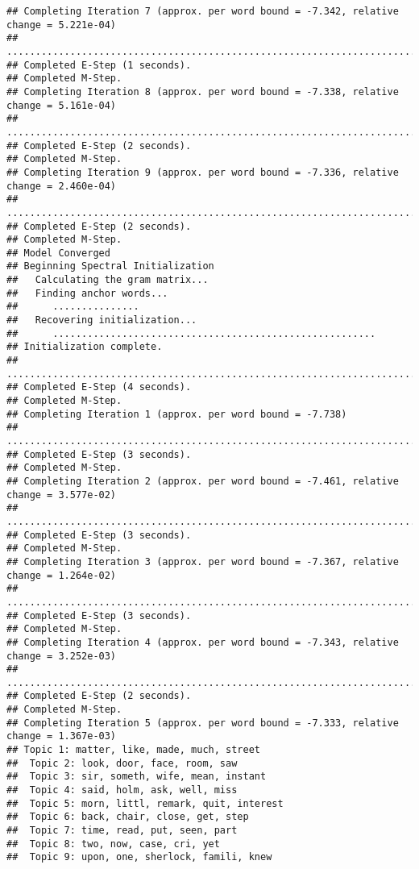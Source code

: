 \documentclass[
]{book}
\begin{document}
\begin{verbatim}
## Completing Iteration 7 (approx. per word bound = -7.342, relative change = 5.221e-04) 
## ....................................................................................................
## Completed E-Step (1 seconds). 
## Completed M-Step. 
## Completing Iteration 8 (approx. per word bound = -7.338, relative change = 5.161e-04) 
## ....................................................................................................
## Completed E-Step (2 seconds). 
## Completed M-Step. 
## Completing Iteration 9 (approx. per word bound = -7.336, relative change = 2.460e-04) 
## ....................................................................................................
## Completed E-Step (2 seconds). 
## Completed M-Step. 
## Model Converged 
## Beginning Spectral Initialization 
##   Calculating the gram matrix...
##   Finding anchor words...
##      ...............
##   Recovering initialization...
##      ........................................................
## Initialization complete.
## ....................................................................................................
## Completed E-Step (4 seconds). 
## Completed M-Step. 
## Completing Iteration 1 (approx. per word bound = -7.738) 
## ....................................................................................................
## Completed E-Step (3 seconds). 
## Completed M-Step. 
## Completing Iteration 2 (approx. per word bound = -7.461, relative change = 3.577e-02) 
## ....................................................................................................
## Completed E-Step (3 seconds). 
## Completed M-Step. 
## Completing Iteration 3 (approx. per word bound = -7.367, relative change = 1.264e-02) 
## ....................................................................................................
## Completed E-Step (3 seconds). 
## Completed M-Step. 
## Completing Iteration 4 (approx. per word bound = -7.343, relative change = 3.252e-03) 
## ....................................................................................................
## Completed E-Step (2 seconds). 
## Completed M-Step. 
## Completing Iteration 5 (approx. per word bound = -7.333, relative change = 1.367e-03) 
## Topic 1: matter, like, made, much, street 
##  Topic 2: look, door, face, room, saw 
##  Topic 3: sir, someth, wife, mean, instant 
##  Topic 4: said, holm, ask, well, miss 
##  Topic 5: morn, littl, remark, quit, interest 
##  Topic 6: back, chair, close, get, step 
##  Topic 7: time, read, put, seen, part 
##  Topic 8: two, now, case, cri, yet 
##  Topic 9: upon, one, sherlock, famili, knew 

\end{verbatim}
\end{document}
